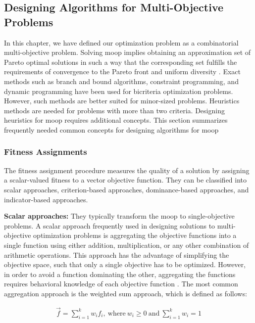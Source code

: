 \subsection{Designing Algorithms for Multi-Objective Problems}
In this chapter, we have defined our optimization problem as a combinatorial multi-objective problem. Solving \gls{moop} implies obtaining an approximation set of Pareto optimal solutions in such a way that the corresponding set fulfills the requirements of convergence to the Pareto front and
uniform diversity \parencite{Talbi2009Metaheuristics:Implementation}. Exact methods such as branch and bound algorithms, constraint programming, and dynamic programming have been used for bicriteria optimization problems. However, such methods are better suited for minor-sized problems. Heuristics methods are needed for problems with more than two criteria. Designing heuristics for \gls{moop} requires additional concepts. This section summarizes frequently needed common concepts for designing algorithms for \gls{moop}


\subsubsection{Fitness Assignments}
The fitness assignment procedure measures the quality of a solution by assigning a scalar-valued fitness to a vector objective function. They can be classified into scalar approaches, criterion-based approaches, dominance-based approaches, and indicator-based approaches.

\textbf{Scalar approaches: }
They typically transform the \gls{moop} to single-objective problems. A scalar approach frequently used in designing solutions to multi-objective optimization problems is aggregating the objective functions into a single function using either addition, multiplication, or any other combination of arithmetic operations. This approach has the advantage of simplifying the objective space, such that only a single objective has to be optimized. However, in order to avoid a function dominating the other, aggregating the functions requires behavioral knowledge of each objective function \parencite{CoelloCoello1999ATechniquesc}. The most common aggregation approach is the weighted sum approach, which is defined as follows:

\begin{gather*}
   \Vec{f} = \sum_{i=1}^k w_i f_i, \ \text{where}\ w_i \geq 0\ \text{and}\ \sum_{i=1}^k w_i = 1
\end{gather*}

